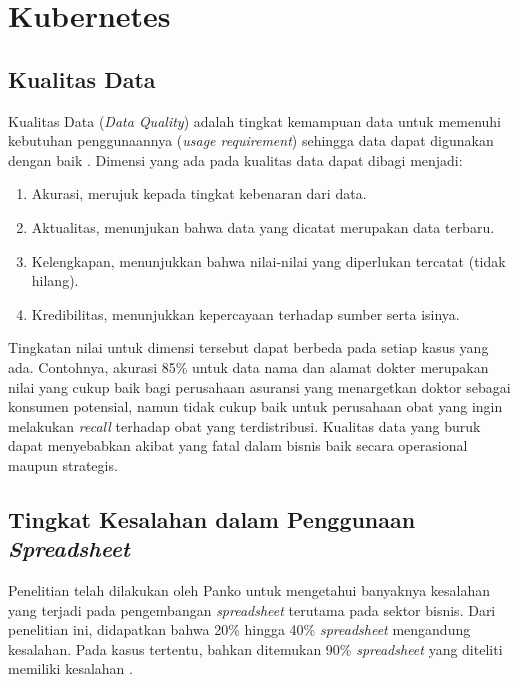 \section{Kubernetes}
\subsection{Kualitas Data}
Kualitas Data (\textit{Data Quality}) adalah tingkat kemampuan data untuk memenuhi kebutuhan penggunaannya (\textit{usage requirement}) sehingga data dapat digunakan dengan baik \citep{Khatri2010}. Dimensi yang ada pada kualitas data dapat dibagi menjadi:

\begin{enumerate}
    \item Akurasi, merujuk kepada tingkat kebenaran dari data.
    \item Aktualitas, menunjukan bahwa data yang dicatat merupakan data terbaru.
    \item Kelengkapan, menunjukkan bahwa nilai-nilai yang diperlukan tercatat (tidak hilang).
    \item Kredibilitas, menunjukkan kepercayaan terhadap sumber serta isinya.
\end{enumerate}

Tingkatan nilai untuk dimensi tersebut dapat berbeda pada setiap kasus yang ada. Contohnya, akurasi 85\% untuk data nama dan alamat dokter merupakan nilai yang cukup baik bagi perusahaan asuransi yang menargetkan doktor sebagai konsumen potensial, namun tidak cukup baik untuk perusahaan obat yang ingin melakukan \textit{recall} terhadap obat yang terdistribusi. Kualitas data yang buruk dapat menyebabkan akibat yang fatal dalam bisnis baik secara operasional maupun strategis.

\subsection{Tingkat Kesalahan dalam Penggunaan \textit{Spreadsheet}}
Penelitian telah dilakukan oleh Panko \citep{Panko1998} untuk mengetahui banyaknya kesalahan yang terjadi pada pengembangan \textit{spreadsheet} terutama pada sektor bisnis. Dari penelitian ini, didapatkan bahwa 20\% hingga 40\% \textit{spreadsheet} mengandung kesalahan. Pada kasus tertentu, bahkan ditemukan 90\% \textit{spreadsheet} yang diteliti memiliki kesalahan \citep{Journal1996}.

